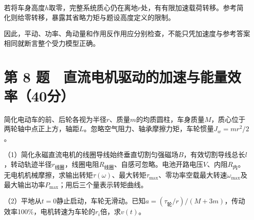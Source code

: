 \documentclass[12pt,a4paper,fontset=fandol]{ctexart}
\begin{document}
若将车身高度\(h\)取零，完整系统质心仍在离地\(r\)处，有有限加速载荷转移。参考简化则给零转移，暴露其省略力矩与题设高度定义的限制。

因此，平动、功率、角动量和作用反作用应分别检查，不能只凭加速度与参考答案相同就断言整个受力模型正确。

\clearpage

\section{第 8
题　直流电机驱动的加速与能量效率（40分）}\label{ux7b2c-8-ux9898-ux76f4ux6d41ux7535ux673aux9a71ux52a8ux7684ux52a0ux901fux4e0eux80fdux91cfux6548ux738740ux5206}

简化电动车的前、后轮各视为半径\(r\)、质量\(m\)的均质圆柱，车身质量\(M\)，质心位于两轮轴中点正上方，轴距\(L\)。忽略空气阻力、轴承摩擦力矩，车轮惯量\(J_w=mr^2/2\)。

（1）简化永磁直流电机的线圈导线始终垂直切割匀强磁场\(B\)，有效切割导线总长\(l\)，转动轨迹半径\(r_{\text{线圈}}\)，线圈电阻\(R_{\text{线圈}}\)、自感可忽略。电池开路电压\(V\)、内阻\(R_{\text{内}}\)。无电机机械摩擦，求输出转矩\(\tau(\omega)\)、最大转矩\(\tau_{\max}\)、零功率空载最大转速\(\omega_{\max}\)及最大输出功率\(P_{\max}\)；用后三个量表示转矩曲线。

\begin{center}
\begin{minipage}{\linewidth}
\centering\begingroup{}
\ifdim\wd\diagrambox>.88\linewidth
\sbox{\diagrambox}{\resizebox{.88\linewidth}{!}{\usebox{\diagrambox}}}\fi
\ifdim\ht\diagrambox>.38\textheight
\resizebox{!}{.38\textheight}{\usebox{\diagrambox}}
\else\usebox{\diagrambox}\fi
\par{}\endgroup\end{minipage}\end{center}

（2）平地从\(t=0\)静止启动，车轮无滑动。已知\(a=(\tau_{\text{轮}}/r)/(M+3m)\)，传动效率100\%，电机转速为车轮的\(r_i\)倍，求\(v(t)\)。
\end{document}
